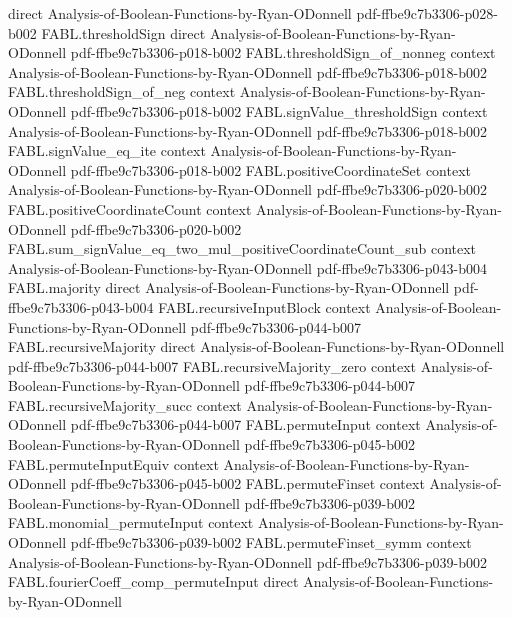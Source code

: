 \begin{theorem}
  {direct}
  {Analysis-of-Boolean-Functions-by-Ryan-ODonnell}
  {pdf-ffbe9c7b3306-p028-b002}
\proofstep
  {FABL.thresholdSign}
  {direct}
  {Analysis-of-Boolean-Functions-by-Ryan-ODonnell}
  {pdf-ffbe9c7b3306-p018-b002}
\proofstep
  {FABL.thresholdSign_of_nonneg}
  {context}
  {Analysis-of-Boolean-Functions-by-Ryan-ODonnell}
  {pdf-ffbe9c7b3306-p018-b002}
\proofstep
  {FABL.thresholdSign_of_neg}
  {context}
  {Analysis-of-Boolean-Functions-by-Ryan-ODonnell}
  {pdf-ffbe9c7b3306-p018-b002}
\proofstep
  {FABL.signValue_thresholdSign}
  {context}
  {Analysis-of-Boolean-Functions-by-Ryan-ODonnell}
  {pdf-ffbe9c7b3306-p018-b002}
\proofstep
  {FABL.signValue_eq_ite}
  {context}
  {Analysis-of-Boolean-Functions-by-Ryan-ODonnell}
  {pdf-ffbe9c7b3306-p018-b002}
\proofstep
  {FABL.positiveCoordinateSet}
  {context}
  {Analysis-of-Boolean-Functions-by-Ryan-ODonnell}
  {pdf-ffbe9c7b3306-p020-b002}
\proofstep
  {FABL.positiveCoordinateCount}
  {context}
  {Analysis-of-Boolean-Functions-by-Ryan-ODonnell}
  {pdf-ffbe9c7b3306-p020-b002}
\proofstep
  {FABL.sum_signValue_eq_two_mul_positiveCoordinateCount_sub}
  {context}
  {Analysis-of-Boolean-Functions-by-Ryan-ODonnell}
  {pdf-ffbe9c7b3306-p043-b004}
\proofstep
  {FABL.majority}
  {direct}
  {Analysis-of-Boolean-Functions-by-Ryan-ODonnell}
  {pdf-ffbe9c7b3306-p043-b004}
\proofstep
  {FABL.recursiveInputBlock}
  {context}
  {Analysis-of-Boolean-Functions-by-Ryan-ODonnell}
  {pdf-ffbe9c7b3306-p044-b007}
\proofstep
  {FABL.recursiveMajority}
  {direct}
  {Analysis-of-Boolean-Functions-by-Ryan-ODonnell}
  {pdf-ffbe9c7b3306-p044-b007}
\proofstep
  {FABL.recursiveMajority_zero}
  {context}
  {Analysis-of-Boolean-Functions-by-Ryan-ODonnell}
  {pdf-ffbe9c7b3306-p044-b007}
\proofstep
  {FABL.recursiveMajority_succ}
  {context}
  {Analysis-of-Boolean-Functions-by-Ryan-ODonnell}
  {pdf-ffbe9c7b3306-p044-b007}
\proofstep
  {FABL.permuteInput}
  {context}
  {Analysis-of-Boolean-Functions-by-Ryan-ODonnell}
  {pdf-ffbe9c7b3306-p045-b002}
\proofstep
  {FABL.permuteInputEquiv}
  {context}
  {Analysis-of-Boolean-Functions-by-Ryan-ODonnell}
  {pdf-ffbe9c7b3306-p045-b002}
\proofstep
  {FABL.permuteFinset}
  {context}
  {Analysis-of-Boolean-Functions-by-Ryan-ODonnell}
  {pdf-ffbe9c7b3306-p039-b002}
\proofstep
  {FABL.monomial_permuteInput}
  {context}
  {Analysis-of-Boolean-Functions-by-Ryan-ODonnell}
  {pdf-ffbe9c7b3306-p039-b002}
\proofstep
  {FABL.permuteFinset_symm}
  {context}
  {Analysis-of-Boolean-Functions-by-Ryan-ODonnell}
  {pdf-ffbe9c7b3306-p039-b002}
\proofstep
  {FABL.fourierCoeff_comp_permuteInput}
  {direct}
  {Analysis-of-Boolean-Functions-by-Ryan-ODonnell}

\end{theorem}
